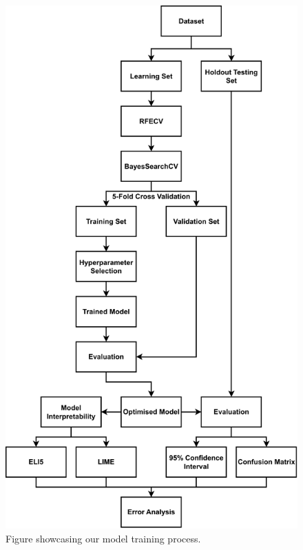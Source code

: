 \begin{figure}[!h]
    \centering
    \includegraphics[width=0.85\linewidth]{images/Model_Training.pdf}    
    \caption{Figure showcasing our model training process.}
    \label{fig:Model_Training} 
\end{figure}



